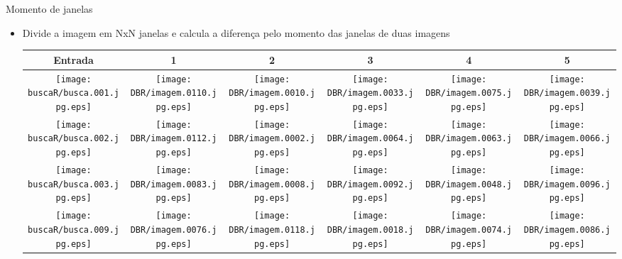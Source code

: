 \documentclass[
    style=paintings,
    paper=screen,
    blackslide,
    nopagebreaks,
    fleqn
]{powerdot}
\begin{document}
\begin{slide}{Momento de janelas}
\begin{itemize}[type=1]
\item <1-> Divide a imagem em NxN janelas e calcula a diferença pelo momento
das janelas de duas imagens
\vspace{-0.8cm}
\begin{table}[H]
\begin{center}
\begin{tabular}{c|ccccc}
\hline 
Entrada & 1 & 2 & 3 & 4 & 5\tabularnewline
\hline
\texttt{[image: buscaR/busca.001.jpg.eps]} & 
\texttt{[image: DBR/imagem.0110.jpg.eps]} & 
\texttt{[image: DBR/imagem.0010.jpg.eps]} & 
\texttt{[image: DBR/imagem.0033.jpg.eps]} & 
\texttt{[image: DBR/imagem.0075.jpg.eps]} &
\texttt{[image: DBR/imagem.0039.jpg.eps]} 
\tabularnewline
\hline 
\texttt{[image: buscaR/busca.002.jpg.eps]} & 
\texttt{[image: DBR/imagem.0112.jpg.eps]} & 
\texttt{[image: DBR/imagem.0002.jpg.eps]} & 
\texttt{[image: DBR/imagem.0064.jpg.eps]} & 
\texttt{[image: DBR/imagem.0063.jpg.eps]} &
\texttt{[image: DBR/imagem.0066.jpg.eps]} 
\tabularnewline
\hline 
\texttt{[image: buscaR/busca.003.jpg.eps]} & 
\texttt{[image: DBR/imagem.0083.jpg.eps]} & 
\texttt{[image: DBR/imagem.0008.jpg.eps]} & 
\texttt{[image: DBR/imagem.0092.jpg.eps]} & 
\texttt{[image: DBR/imagem.0048.jpg.eps]} &
\texttt{[image: DBR/imagem.0096.jpg.eps]} 
\tabularnewline
\hline 
\texttt{[image: buscaR/busca.009.jpg.eps]} & 
\texttt{[image: DBR/imagem.0076.jpg.eps]} & 
\texttt{[image: DBR/imagem.0118.jpg.eps]} & 
\texttt{[image: DBR/imagem.0018.jpg.eps]} & 
\texttt{[image: DBR/imagem.0074.jpg.eps]} &
\texttt{[image: DBR/imagem.0086.jpg.eps]} 
\tabularnewline
\hline 
\end{tabular}
\end{center}
\end{table}
\end{itemize}
\end{slide}
\end{document}
